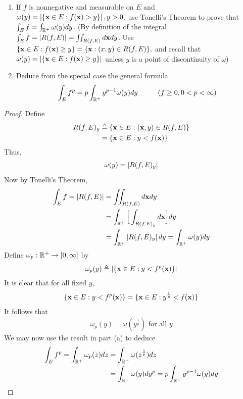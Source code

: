 \documentclass{report}
\begin{document}
\begin{question}{}{}
\begin{enumerate}[label=(\alph*)]
  \item If $f$ is nonnegative and measurable on $E$ and  $\omega (y)= \left|\{ \textbf{x}\in E: f(\textbf{x})>y \}\right|,y>0$, use Tonelli's Theorem to prove that  $\int_E f=\int_{\mathbb{R}^+}\omega (y)dy$. (By definition of the integral $\int_E f=\left|R(f,E)\right|=\iint_{R(f,E)} d\textbf{x}dy$. Use $\{ \textbf{x}\in E:f(\textbf{x})\geq y \}=\{ \textbf{x}:(x,y)\in R(f,E) \},$ and recall that $\omega (y)= \left|\{ \textbf{x}\in E:f(\textbf{x})\geq y \}\right|$ unless $y$ is a point of discontinuity of  $\omega$)
  \item Deduce from the special case the general formula 
    \begin{align*}
    \int_E f^p = p \int_{\mathbb{R}^+} y^{p-1}\omega (y)dy\hspace{1cm}(f\geq 0,0<p<\infty)
    \end{align*}
\end{enumerate}
\end{question}
\begin{proof}
Define 
\begin{align*}
  R(f,E)_y&\triangleq \{ \textbf{x} \in E:(\textbf{x},y)\in R(f,E) \} \\
  &= \{ \textbf{x}\in E: y< f(\textbf{x}) \}
\end{align*}
Thus, 
\begin{align*}
\omega (y)= \left|R(f,E)_y\right|
\end{align*}
Now by Tonelli's Theorem, 
\begin{align*}
\int_E f=\left|R(f,E)\right|&= \iint_{R(f,E)}d\textbf{x}dy \\
&=\int_{\mathbb{R}^+} \Big[\int_{R(f,E)_y} d\textbf{x}  \Big] dy \\
&=\int_{\mathbb{R}^+} \left|R(f,E)_y\right| dy=\int_{\mathbb{R}^+}\omega (y)dy
\end{align*}
Define $\omega_p:\mathbb{R}^+\rightarrow [0,\infty]$ by 
\begin{align*}
  \omega_p (y)\triangleq \left|\{ \textbf{x}\in E: y<f^p(\textbf{x}) \}\right|
\end{align*}
It is clear that for all fixed $y$, 
 \begin{align*}
\{ \textbf{x}\in E:y <f^p(\textbf{x}) \}= \{ \textbf{x}\in E: y^{\frac{1}{p}}<f(\textbf{x}) \}
\end{align*}
It follows that 
\begin{align*}
\omega_p(y)= \omega (y^{\frac{1}{p}})\text{ for all }y
\end{align*}
We may now use the result in part (a) to deduce 
\begin{align*}
\int_E f^p= \int_{\mathbb{R}^+}\omega_p(z)dz&=\int_{\mathbb{R}^+}\omega (z ^{\frac{1}{p}})dz  \\
&=\int_{\mathbb{R}^+}\omega (y)dy^{p}=  p \int_{\mathbb{R}^+}y^{p-1}\omega (y)dy
\end{align*}
\end{proof}
\end{document}
